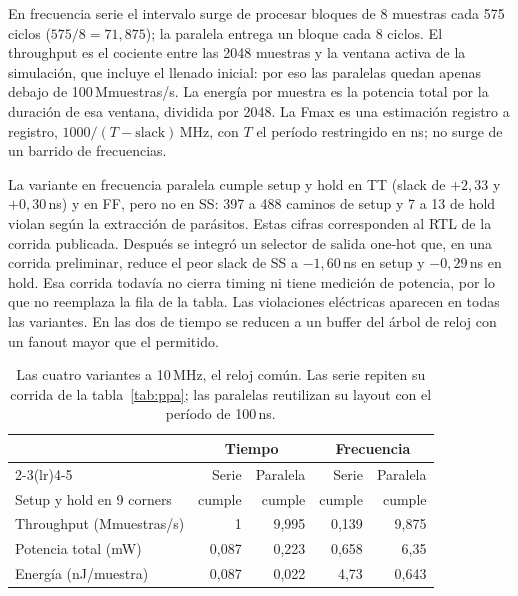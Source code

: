 En frecuencia serie el intervalo surge de procesar bloques de 8 muestras cada 575 ciclos ($575/8 = 71{,}875$); la paralela entrega un bloque cada 8 ciclos. El throughput es el cociente entre las 2048 muestras y la ventana activa de la simulación, que incluye el llenado inicial: por eso las paralelas quedan apenas debajo de 100\,Mmuestras/s. La energía por muestra es la potencia total por la duración de esa ventana, dividida por 2048. La Fmax es una estimación registro a registro, $1000/(T - \text{slack})$\,MHz, con $T$ el período restringido en ns; no surge de un barrido de frecuencias.

La variante en frecuencia paralela cumple setup y hold en TT (slack de $+2{,}33$ y $+0{,}30$\,ns) y en FF, pero no en SS: 397 a 488 caminos de setup y 7 a 13 de hold violan según la extracción de parásitos. Estas cifras corresponden al RTL de la corrida publicada. Después se integró un selector de salida one-hot que, en una corrida preliminar, reduce el peor slack de SS a $-1{,}60$\,ns en setup y $-0{,}29$\,ns en hold. Esa corrida todavía no cierra timing ni tiene medición de potencia, por lo que no reemplaza la fila de la tabla. Las violaciones eléctricas aparecen en todas las variantes. En las dos de tiempo se reducen a un buffer del árbol de reloj con un fanout mayor que el permitido.

\begin{table}[h]
  \centering
  \caption{Las cuatro variantes a 10\,MHz, el reloj común. Las serie repiten su corrida de la tabla~\ref{tab:ppa}; las paralelas reutilizan su layout con el período de 100\,ns.}\label{tab:ppa-10mhz}
  \small
  \begin{tabular}{lrrrr}
    \toprule
    & \multicolumn{2}{c}{Tiempo} & \multicolumn{2}{c}{Frecuencia} \\
    \cmidrule(lr){2-3}\cmidrule(lr){4-5}
    & Serie & Paralela & Serie & Paralela \\
    \midrule
    Setup y hold en 9 corners & cumple & cumple & cumple & cumple \\
    Throughput (Mmuestras/s) & 1 & 9,995 & 0,139 & 9,875 \\
    Potencia total (mW) & 0,087 & 0,223 & 0,658 & 6,35 \\
    Energía (nJ/muestra) & 0,087 & 0,022 & 4,73 & 0,643 \\
    \bottomrule
  \end{tabular}
\end{table}

